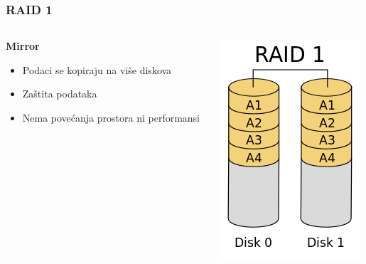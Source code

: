 \documentclass[t]{beamer}
\begin{document}
\begin{frame}
	\frametitle{RAID 1}
	
	\begin{columns}[T]
	\begin{column}{0.6\textwidth}
		\textbf{Mirror}
		\begin{itemize}
			\item Podaci se kopiraju na više diskova
		\end{itemize}
		\begin{itemize}
			\item Zaštita podataka
			\item Nema povećanja prostora ni performansi
		\end{itemize}
	\end{column}
	\begin{column}{0.3\textwidth}
		\includegraphics[width=\textwidth]{200px-RAID_1.png}
	\end{column}
	\end{columns}
\end{frame}
\end{document}

